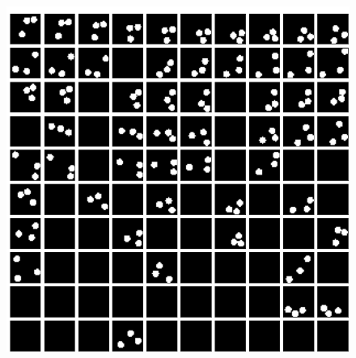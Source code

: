 \begin{frame}
\begin{figure}[h!]
\begin{minipage}{0.32\textwidth}
	\end{minipage}
	\begin{minipage}{0.32\textwidth}
		\hfill
	\end{minipage}
	
	\begin{minipage}{0.32\textwidth}
		\center
		\includegraphics[scale=0.12]{Bilder/bouncingBalls_VAE}
	\end{minipage}
	\begin{minipage}{0.32\textwidth}
		\center

\end{minipage}
\end{figure}
\end{frame}
